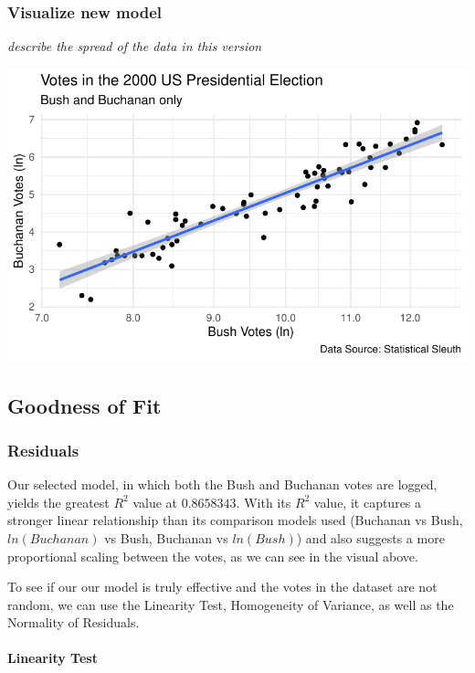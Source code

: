 \documentclass[
  letterpaper,
  DIV=11,
  numbers=noendperiod]{scrartcl}
\let\oldparagraph\paragraph
\renewcommand{\paragraph}[1]{\oldparagraph{#1}\mbox{}}
\begin{document}
\hypertarget{visualize-new-model}{%
\subsubsection{Visualize new model}\label{visualize-new-model}}

\emph{describe the spread of the data in this version}

\includegraphics{sds-291_s-24_case-study-template_files/figure-pdf/unnamed-chunk-6-1.pdf}

\hypertarget{goodness-of-fit}{%
\subsection{Goodness of Fit}\label{goodness-of-fit}}

\hypertarget{residuals}{%
\subsubsection{Residuals}\label{residuals}}

Our selected model, in which both the Bush and Buchanan votes are
logged, yields the greatest \(R^2\) value at \(0.8658343\). With its
\(R^2\) value, it captures a stronger linear relationship than its
comparison models used (Buchanan vs Bush, \(ln(Buchanan)\) vs Bush,
Buchanan vs \(ln(Bush)\)) and also suggests a more proportional scaling
between the votes, as we can see in the visual above.

To see if our our model is truly effective and the votes in the dataset
are not random, we can use the Linearity Test, Homogeneity of Variance,
as well as the Normality of Residuals.

\hypertarget{linearity-test}{%
\paragraph{Linearity Test}\label{linearity-test}}
\end{document}
